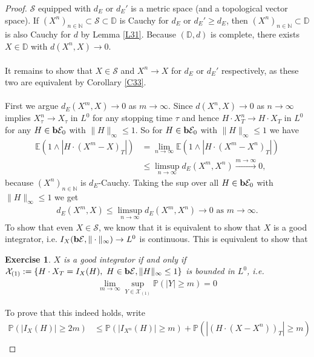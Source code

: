 \documentclass[12pt,a4paper, twoside]{article}
\newtheorem{exe}{Exercise}[section]
\theoremstyle{definition}
\newcommand{\EE}{\mathbb{E}} %
\newcommand{\PP}{\mathbb{P}} %
\newcommand{\simple}{\textbf{\text{b}}\mathcal{E}}
\begin{document}
\begin{proof}
$\mathcal{S}$ equipped with $d_E$ or $d_E'$ is a metric space (and a topological vector space). If $(X^n)_{n \in \mathbb{N}} \subset \mathcal{S} \subset \mathbb{D}$ is Cauchy for $d_E$ or $d_E' \geq d_E$, then $(X^n)_{n \in \mathbb{N}} \subset \mathbb{D}$ is also Cauchy for $d$ by Lemma \ref{L31}. Because $( \mathbb{D},d)$ is complete, there exists $X \in \mathbb{D}$ with $d(X^n,X) \to 0$. 
\\\\
It remains to show that $X \in \mathcal{S}$ and $X^n \to X$ for $d_E$ or $d_E'$ respectively, as these two are equivalent by Corollary \ref{C33}. \\
\\
First we argue $d_E(X^m,X) \to 0$ as $m \to \infty$. Since $d(X^n, X) \to 0$ as $n \to \infty$ implies $X_\tau^n \to X_\tau$ in $L^0$ for any stopping time $\tau$ and hence $H \cdot X_T^n \to H \cdot X_T$ in $L^0$ for any $H \in \simple_0$ with $\|H\|_\infty \leq 1$. So for $H \in \simple_0$ with $\|H\|_\infty \leq 1$ we have 
\begin{align*}
\EE(1 \wedge | H \cdot (X^m-X)_T|) &= \lim_{n \to \infty} \EE(1 \wedge |H \cdot (X^m-X^n)_T|) \\ &\leq \limsup_{n \to \infty} d_E(X^m , X^n) \xrightarrow{m \to \infty} 0,
\end{align*}
because $(X^n)_{n \in \mathbb{N}}$ is $d_E$-Cauchy. Taking the sup over all $H \in \simple_0$ with $\|H\|_\infty \leq 1$ we get 
\begin{align*}
d_E(X^m, X) \leq \limsup_{n \to \infty} d_E(X^m,X^n) \to 0 \text{ as } m \to \infty. 
\end{align*}
To show that even $X \in \mathcal{S}$, we know that it is equivalent to show that $X$ is a good integrator, i.e. $I_X(\simple , \| \cdot \|_\infty) \to L^0$ is continuous. This is equivalent to show that 
\begin{exe} \label{ex7} $X$ is a good integrator if and only if $\mathcal{X}_{(1)}:= \{ H \cdot X_T = I_X(H), \ H \in \simple, \|H\|_\infty \leq 1\}$ is bounded in $L^0$, i.e.
\begin{align*}
\lim_{m \to \infty} \sup_{Y \in \mathcal{X}_{(1)}} \PP( |Y| \geq m)=0
\end{align*}
\end{exe}
To prove that this indeed holds, write
\begin{align*}
\PP(|I_X(H)| \geq 2m) &\leq \PP( |I_{X^n}(H)| \geq m) +  \PP( |(H \cdot (X-X^n))_T| \geq m) \\

\end{align*}
\end{proof}
\end{document}
